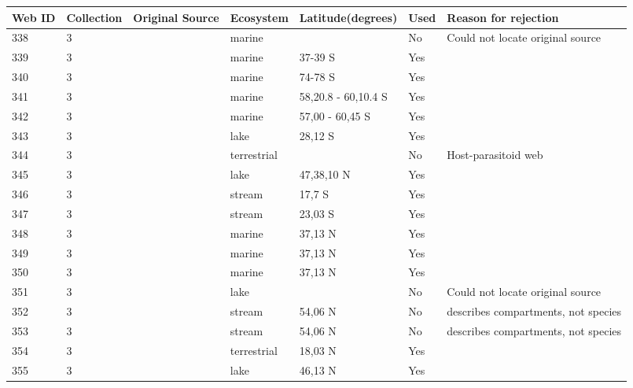\documentclass[12pt]{article}
\begin{document}
\begin{landscape}
    \begin{table}[h!]
    \centering
    {\footnotesize
      \begin{tabular}{p{2.8cm}p{1.3cm}p{5.5cm}p{2.2cm}p{2.5cm}lp{3.5cm}}
        \hline
        Web ID & Collection & Original Source & Ecosystem & Latitude(degrees) & Used  & Reason for rejection  \\
        \hline
        338   & 3 & \citet{Torres2013}  & marine &       & No    & Could not locate original source \\
        339   & 3 & \citet{Bulman2001}  & marine & 37-39 S & Yes   &       \\
        340   & 3 & \citet{Smith2007}  & marine & 74-78 S & Yes   &       \\
        341   & 3 & \citet{Lancraft1991}  & marine & 58,20.8 - 60,10.4 S & Yes   &       \\
        342   & 3 & \citet{Hopkins1993}  & marine & 57,00 - 60,45 S & Yes   &       \\
        343   & 3 & \citet{Kitching1987}  & lake  & 28,12 S & Yes   &       \\
        344   & 3 & \citet{Hodkinson2004}  & terrestrial &       & No    & Host-parasitoid web \\
        345   & 3 & \citet{Boit2012}  & lake  & 47,38,10 N & Yes   &       \\
        346   & 3 & \citet{Rayner2010}  & stream & 17,7 S & Yes   &       \\
        347   & 3 & \citet{Motta2005}  & stream & 23,03 S & Yes   &       \\
        348   & 3 & \citet{Douglass2011}    & marine & 37,13 N & Yes   &       \\
        349   & 3 & \citet{Douglass2011}    & marine & 37,13 N & Yes   &       \\
        350   & 3 & \citet{Douglass2011}    & marine & 37,13 N & Yes   &       \\
        351   & 3 & \citet{Warren1989}     & lake  &       & No    & Could not locate original source \\
        352   & 3 & \citet{Poepperl2003}  & stream & 54,06 N & No    & describes compartments, not species \\
        353   & 3 & \citet{Poepperl2003}  & stream & 54,06 N & No    & describes compartments, not species \\
        354   & 3 & \citet{Goldwasser1993}  & terrestrial & 18,03 N & Yes   &       \\
        355   & 3 & \citet{Cohen2003}    & lake  & 46,13 N & Yes   &       \\

\end{tabular}}
\end{table}
\end{landscape}
\end{document}
